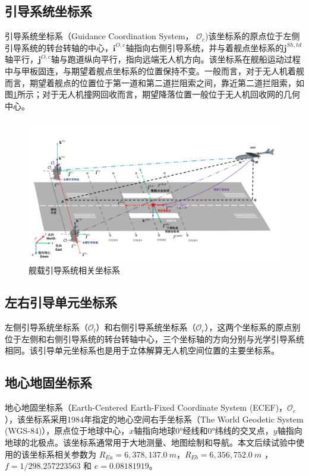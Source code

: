 \subsection{引导系统坐标系}
引导系统坐标系（Guidance Coordination System， $\mathcal{O}_c$)该坐标系的原点位于左侧引导系统的转台转轴的中心，$\mathbf{i}^{O,c}$轴指向右侧引导系统，并与着舰点坐标系的$\mathbf{j}^{Sh,td}$轴平行，$\mathbf{j}^{O,c}$轴与跑道纵向平行，指向远端无人机方向。该坐标系在舰船运动过程中与甲板固连，与期望着舰点坐标系的位置保持不变。一般而言，对于无人机着舰而言，期望着舰点的位置位于第一道和第二道拦阻索之间，靠近第二道拦阻索，如图\ref{fig:chp02_10_guidance_sys}所示；对于无人机撞网回收而言，期望降落位置一般位于无人机回收网的几何中心。
\begin{figure}[htb]   
	\centering
	\includegraphics[width=\textwidth]{figs/chp02/chp02_10_guidance_sys.pdf}
	\caption{舰载引导系统相关坐标系}
	\label{fig:chp02_10_guidance_sys}
\end{figure}

\subsection{左右引导单元坐标系}
左侧引导系统坐标系（$\mathcal{O}_l$）和右侧引导系统坐标系（$\mathcal{O}_r$），这两个坐标系的原点别位于左侧和右侧引导系统的转台转轴中心，三个坐标轴的方向分别与光学引导系统相同。该引导单元坐标系也是用于立体解算无人机空间位置的主要坐标系。

\subsection{地心地固坐标系}
地心地固坐标系（Earth-Centered Earth-Fixed Coordinate System (ECEF)，$\mathcal{O}_e$），该坐标系采用1984年\cite{WGS84}指定的地心空间右手坐标系（The World Geodetic System (WGS-84)），原点位于地球中心，$x$轴指向地球0°经线和0°纬线的交叉点，$y$轴指向地球的北极点。该坐标系通常用于大地测量、地图绘制和导航。本文后续试验中使用的该坐标系相关参数为 $R_{Ea}=6,378,137.0\ m$，$R_{Eb} = 6,356,752.0\ m$ ，$f=1/298.257223563$ 和 $e=0.08181919$。

